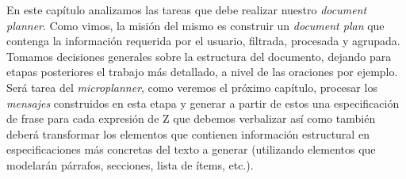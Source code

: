 \bigskip
En este capítulo analizamos las tareas que debe realizar nuestro \emph{document planner}. Como vimos, la misión del mismo es construir un \emph{document plan} que contenga la información requerida por el usuario, filtrada, procesada y agrupada. Tomamos decisiones generales sobre la estructura del documento, dejando para etapas posteriores el trabajo más detallado, a nivel de las oraciones por ejemplo. Será tarea del \emph{microplanner}, como veremos el próximo capítulo, procesar los \emph{mensajes} construidos en esta etapa y generar a partir de estos una especificación de frase para cada expresión de Z que debemos verbalizar así como también deberá transformar los elementos que contienen información estructural en especificaciones más concretas del texto a generar (utilizando elementos que modelarán párrafos, secciones, lista de ítems, etc.).
